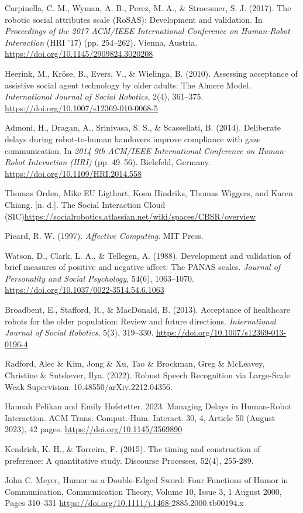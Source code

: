 \documentclass[runningheads]{llncs}
\begin{document}
\begin{thebibliography}{20}
Carpinella, C. M., Wyman, A. B., Perez, M. A., \& Stroessner, S. J. (2017). The robotic social attributes scale (RoSAS): Development and validation. In \emph{Proceedings of the 2017 ACM/IEEE International Conference on Human-Robot Interaction} (HRI '17) (pp. 254–262). Vienna, Austria. \url{https://doi.org/10.1145/2909824.3020208}

Heerink, M., Kröse, B., Evers, V., \& Wielinga, B. (2010). Assessing acceptance of assistive social agent technology by older adults: The Almere Model. \emph{International Journal of Social Robotics}, 2(4), 361–375. \url{https://doi.org/10.1007/s12369-010-0068-5}

Admoni, H., Dragan, A., Srinivasa, S. S., \& Scassellati, B. (2014). Deliberate delays during robot-to-human handovers improve compliance with gaze communication. In \emph{2014 9th ACM/IEEE International Conference on Human-Robot Interaction (HRI)} (pp. 49–56). Bielefeld, Germany. \url{https://doi.org/10.1109/HRI.2014.558}


 Thomas Orden, Mike EU Ligthart, Koen Hindriks, Thomas Wiggers, and Karen Chiang. [n. d.]. The Social Interaction Cloud (SIC)\url{https://socialrobotics.atlassian.net/wiki/spaces/CBSR/overview}

Picard, R. W. (1997). \emph{Affective Computing}. MIT Press.

Watson, D., Clark, L. A., \& Tellegen, A. (1988). Development and validation of brief measures of positive and negative affect: The PANAS scales. \emph{Journal of Personality and Social Psychology}, 54(6), 1063–1070. \url{https://doi.org/10.1037/0022-3514.54.6.1063}

Broadbent, E., Stafford, R., \& MacDonald, B. (2013). Acceptance of healthcare robots for the older population: Review and future directions. \emph{International Journal of Social Robotics}, 5(3), 319–330. \url{https://doi.org/10.1007/s12369-013-0196-4}

Radford, Alec \& Kim, Jong \& Xu, Tao \& Brockman, Greg \& McLeavey, Christine \& Sutskever, Ilya. (2022). Robust Speech Recognition via Large-Scale Weak Supervision. 10.48550/arXiv.2212.04356. 

Hannah Pelikan and Emily Hofstetter. 2023. Managing Delays in Human-Robot Interaction. ACM Trans. Comput.-Hum. Interact. 30, 4, Article 50 (August 2023), 42 pages. \url{https://doi.org/10.1145/3569890}

Kendrick, K. H., \& Torreira, F. (2015). The timing and construction of preference: A quantitative study. Discourse Processes, 52(4), 255-289.

John C. Meyer, Humor as a Double-Edged Sword: Four Functions of Humor in Communication, Communication Theory, Volume 10, Issue 3, 1 August 2000, Pages 310–331
\url{https://doi.org/10.1111/j.1468-}2885.2000.tb00194.x

\end{thebibliography}
\end{document}
